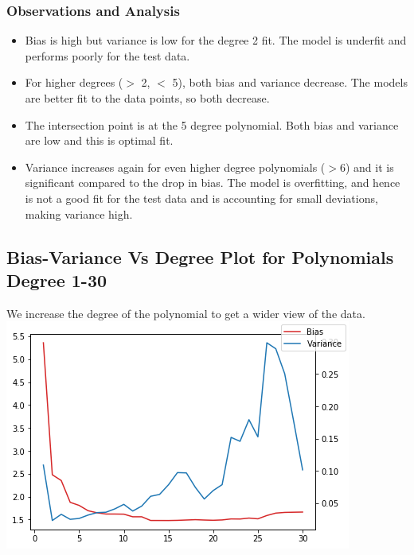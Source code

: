 \documentclass{article}
\begin{document}
\subsubsection{Observations and Analysis}
\begin{itemize}
\item Bias is high but variance is low for the degree 2 fit. The model is underfit and performs poorly for the test data.
\item For higher degrees ($>$ 2, $<$ 5), both bias and variance decrease. The models are better fit to the data points, so both decrease.
\item The intersection point is at the 5 degree polynomial. Both bias and variance are low and this is optimal fit.
\item Variance increases again for even higher degree polynomials ($>$6) and it is significant compared to the drop in bias. The model is overfitting, and hence is not a good fit for the test data and is accounting for small deviations, making variance high.
\end{itemize}
\subsection{Bias-Variance Vs Degree Plot for Polynomials Degree 1-30}
We increase the degree of the polynomial to get a wider view of the data.
\includegraphics[scale=.9]{images/1-30.png}
\end{document}
